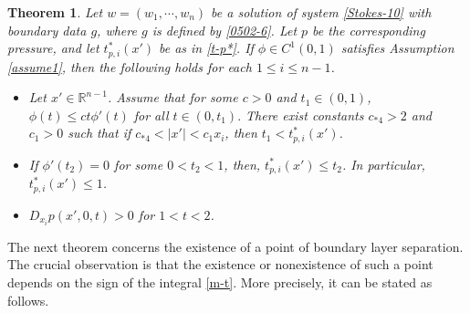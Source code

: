 \documentclass{amsart}
\newtheorem{theorem}[defn]{Theorem}
\numberwithin{equation}{section}
\begin{document}
\begin{theorem}\label{pressure1103}
Let  $w = (w_1, \cdots, w_n)$ be a solution   of   system  \eqref{Stokes-10} with boundary data $g$, where $ g$ is defined by \eqref{0502-6}.  Let $p$ be the  corresponding pressure, and let $t_{p,i}^* (x')$  be as in \eqref{t-p*}.
If $\phi \in C^1(0,1)$ satisfies Assumption \ref{assume1}, then the following holds for each $1 \leq i \leq n-1$.
 \begin{itemize}
\item[(i)]
Let $x'\in \mathbb R^{n-1}$.
Assume that for some $c>0$ and $t_1 \in (0,1)$, $ \phi(t) \leq c  t \phi'(t) $ for all $ t\in (0, t_1).$
There exist constants  $c_{*4}>2$ and $ c_1> 0$ such that if $ c_{*4} < |x'| < c_1 x_i$, then $t_1 < t_{p,i}^* (x')$.
\item[(ii)]
If $ \phi'(t_2) =0 $ for some $ 0 < t_2 < 1$, then, $t_{p,i}^* (x') \leq  t_2$.
 In particular, $ t_{p,i}^* (x') \leq 1$.
 
 \item[(iii)]
 $D_{x_i} p(x', 0, t) > 0$ for $ 1 < t <2$.

\end{itemize}

\end{theorem}

The next theorem concerns the existence of a point of boundary layer separation. The crucial observation is that the existence or nonexistence of such a point depends on the sign of the integral \eqref{m-t}. More precisely, it can be stated as follows.
\end{document}
